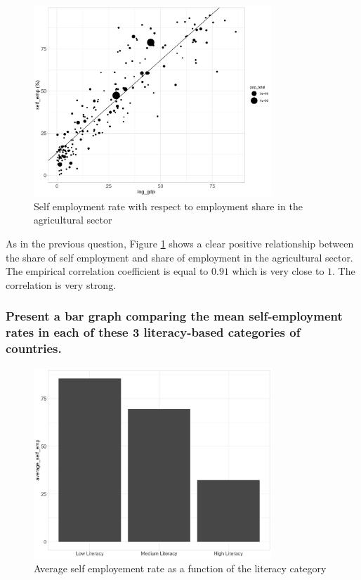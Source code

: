 \begin{figure}[htbp]
  \centering
  \includegraphics[width=0.8\textwidth]{Exercise_1/OUTPUT/emp_wrt_agro.png}
  \caption{Self employment rate with respect to employment share in the agricultural sector}
  \label{fig:emp_agro}
\end{figure}

As in the previous question, Figure \ref{fig:emp_agro} shows a clear positive relationship between the share of self employment and share of employment in the agricultural sector. The empirical correlation coefficient is equal to $0.91$
which is very close to $1$. The correlation is very strong.

\subsubsection{Present a bar graph comparing the mean self-employment rates in each of these 3 literacy-based categories of countries.}
\begin{figure}[htbp]
  \centering
  \includegraphics[width=0.8\textwidth]{Exercise_1/OUTPUT/bar_emp_literacy.png}
  \caption{Average self employement rate as a function of the literacy category}
  \label{fig:emp_lit}
\end{figure}

